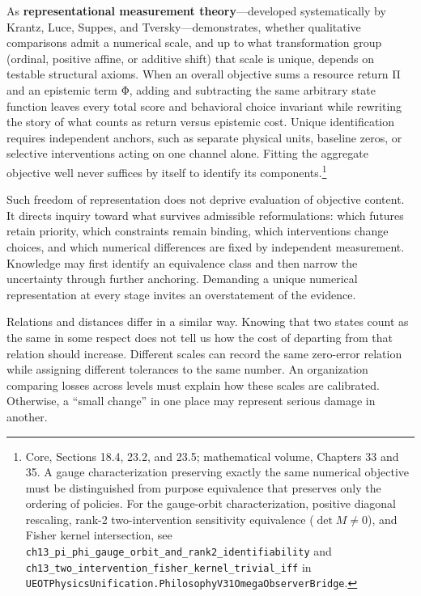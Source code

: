 \documentclass[
  english,
  11pt,
  oneside]{book}
\begin{document}
As \textbf{representational measurement theory}---developed systematically by Krantz, Luce, Suppes, and Tversky---demonstrates, whether qualitative comparisons admit a numerical scale, and up to what transformation group (ordinal, positive affine, or additive shift) that scale is unique, depends on testable structural axioms. When an overall objective sums a resource return Π and an epistemic term Φ, adding and subtracting the same arbitrary state function leaves every total score and behavioral choice invariant while rewriting the story of what counts as return versus epistemic cost. Unique identification requires independent anchors, such as separate physical units, baseline zeros, or selective interventions acting on one channel alone. Fitting the aggregate objective well never suffices by itself to identify its components.\footnote{\hypertarget{ph-note-36}{}Core, Sections 18.4, 23.2, and 23.5; mathematical volume, Chapters 33 and 35. A gauge characterization preserving exactly the same numerical objective must be distinguished from purpose equivalence that preserves only the ordering of policies. For the gauge-orbit characterization, positive diagonal rescaling, rank-2 two-intervention sensitivity equivalence (\(\det M \neq 0\)), and Fisher kernel intersection, see \nolinkurl{ch13_pi_phi_gauge_orbit_and_rank2_identifiability} and \nolinkurl{ch13_two_intervention_fisher_kernel_trivial_iff} in \nolinkurl{UEOTPhysicsUnification.PhilosophyV31OmegaObserverBridge}.}

Such freedom of representation does not deprive evaluation of objective content. It directs inquiry toward what survives admissible reformulations: which futures retain priority, which constraints remain binding, which interventions change choices, and which numerical differences are fixed by independent measurement. Knowledge may first identify an equivalence class and then narrow the uncertainty through further anchoring. Demanding a unique numerical representation at every stage invites an overstatement of the evidence.

Relations and distances differ in a similar way. Knowing that two states count as the same in some respect does not tell us how the cost of departing from that relation should increase. Different scales can record the same zero-error relation while assigning different tolerances to the same number. An organization comparing losses across levels must explain how these scales are calibrated. Otherwise, a ``small change'' in one place may represent serious damage in another.
\end{document}
